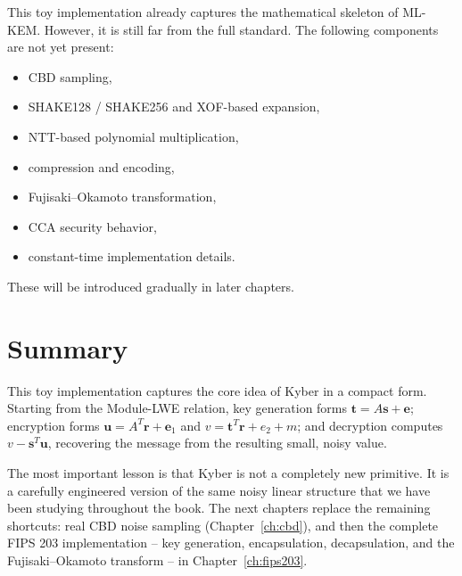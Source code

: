 This toy implementation already captures the mathematical skeleton of ML-KEM. However, it is still far from the full standard. The following components are not yet present:

\begin{itemize}
    \item CBD sampling,
    \item SHAKE128 / SHAKE256 and XOF-based expansion,
    \item NTT-based polynomial multiplication,
    \item compression and encoding,
    \item Fujisaki--Okamoto transformation,
    \item CCA security behavior,
    \item constant-time implementation details.
\end{itemize}

These will be introduced gradually in later chapters.

\section{Summary}

This toy implementation captures the core idea of Kyber in a compact form. Starting from the Module-LWE relation, key generation forms $\mathbf{t}=A\mathbf{s}+\mathbf{e}$; encryption forms $\mathbf{u}=A^{T}\mathbf{r}+\mathbf{e}_1$ and $v=\mathbf{t}^{T}\mathbf{r}+e_2+m$; and decryption computes $v-\mathbf{s}^{T}\mathbf{u}$, recovering the message from the resulting small, noisy value.

The most important lesson is that Kyber is not a completely new primitive. It is a carefully engineered version of the same noisy linear structure that we have been studying throughout the book. The next chapters replace the remaining shortcuts: real CBD noise sampling (Chapter~\ref{ch:cbd}), and then the complete FIPS 203 implementation -- key generation, encapsulation, decapsulation, and the Fujisaki--Okamoto transform -- in Chapter~\ref{ch:fips203}.

\printbibliography[heading=chapterrefs]
